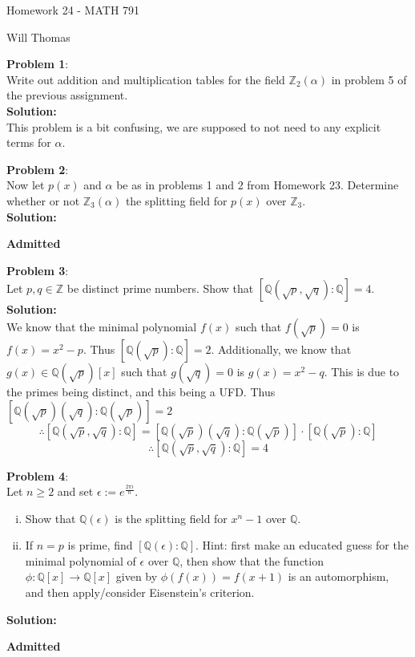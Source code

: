 \documentclass[11pt]{article}
\newcommand{\prob}[3]{\begin{flushleft}
        \textbf{Problem #1}: \\
        #2 
		\textbf{Solution:} 
		#3

\end{flushleft}}
\newcommand{\admit}{
  \begin{flushright}
    \textbf{Admitted}
  \end{flushright}
}
\newcommand{\makeHWtitle}[1]{
    \begin{center}
    \Large{Homework #1 - MATH 791} 
        \vspace{5pt}
        
        \normalsize{Will Thomas}
        \vspace{5pt}
    \end{center}
}
\begin{document}
\makeHWtitle{24}

\prob{1}{
  Write out addition and multiplication tables for the field $\mathbb{Z}_2(\alpha)$ in problem 5 of the previous assignment. \\
}{\\
  This problem is a bit confusing, we are supposed to not need to
  any explicit terms for $\alpha$.
}

\prob{2}{
  Now let $p(x)$ and $\alpha$ be as in problems 1 and 2 from Homework 23.
  Determine whether or not $\mathbb{Z}_3(\alpha)$ the splitting field for $p(x)$
  over $\mathbb{Z}_3$. \\
}{\\
  \admit
}

\prob{3}{
Let $p,q \in \mathbb{Z}$ be distinct prime numbers. Show that $[\mathbb{Q}(\sqrt{p}, \sqrt{q}) : \mathbb{Q}] = 4$. \\
}{\\
We know that the minimal polynomial $f(x)$ such that $f(\sqrt{p}) = 0$ is $f(x) = x^2 - p$. Thus $[\mathbb{Q}(\sqrt{p}) : \mathbb{Q}] = 2$.
Additionally, we know that $g(x) \in \mathbb{Q}(\sqrt{p})[x]$ such that $g(\sqrt{q}) = 0$ is $g(x) = x^2 - q$. This is due to the primes being distinct, and this being a UFD.
Thus $[\mathbb{Q}(\sqrt{p})(\sqrt{q}) : \mathbb{Q}(\sqrt{p})] = 2$
$$\therefore [\mathbb{Q}(\sqrt{p}, \sqrt{q}) : \mathbb{Q}] = [\mathbb{Q}(\sqrt{p})(\sqrt{q}) : \mathbb{Q}(\sqrt{p})] \cdot [\mathbb{Q}(\sqrt{p}) : \mathbb{Q}]$$
$$\therefore [\mathbb{Q}(\sqrt{p}, \sqrt{q}) : \mathbb{Q}] = 4$$
}

\prob{4}{
  Let $n \geq 2$ and set $\epsilon := e^{\frac{2\pi i}{n}}$.
  \begin{enumerate}[(i)]
    \item Show that $\mathbb{Q}(\epsilon)$ is the splitting field for $x^n - 1$ over $\mathbb{Q}$.
    \item If $n = p$ is prime, find $[\mathbb{Q}(\epsilon) : \mathbb{Q}]$.
          Hint: first make an educated guess for the minimal polynomial of $\epsilon$
          over $\mathbb{Q}$, then show that the function $\phi : \mathbb{Q}[x] \rightarrow \mathbb{Q}[x]$ given by $\phi(f(x)) = f(x + 1)$ is an automorphism,
          and then apply/consider Eisenstein's criterion.
  \end{enumerate}
}{\\
  \admit
}
\end{document}
